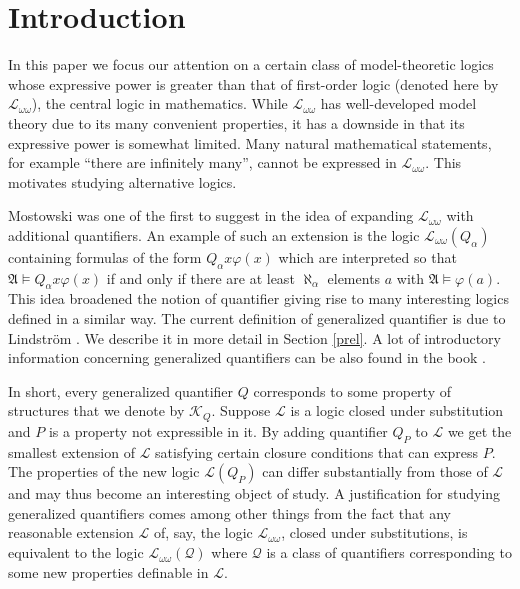 \documentclass{ndjflart}
\theoremstyle{plain}
\theoremstyle{definition}
\numberwithin{equation}{section}
\begin{document}

\section{Introduction}

In this paper we focus our attention on a certain class of model-theoretic logics whose expressive power is greater than that of first-order logic (denoted here by $\mathcal{L}_{\omega\omega}$), the central logic in mathematics.
While $\mathcal{L}_{\omega\omega}$ has well-developed model theory due to its many convenient properties, it has a downside in that its expressive power is somewhat limited. 
Many natural mathematical statements, for example ``there are infinitely many'', cannot be expressed in $\mathcal{L}_{\omega\omega}$.
This motivates studying alternative logics.

Mostowski was one of the first to suggest in \cite{Mostowski:1957} 
the idea of expanding $\mathcal{L}_{\omega\omega}$ with additional quantifiers.
An example of such an extension is the logic $\mathcal{L}_{\omega\omega}(Q_{\alpha})$ containing formulas of the form $Q_{\alpha} x \varphi(x)$ which are interpreted so that $\mathfrak{A} \vDash  Q_{\alpha} x \varphi(x)$ if and only if there are at least $\aleph_{\alpha}$ elements $a$ with $\mathfrak{A} \vDash \varphi(a)$.
This idea broadened the notion of quantifier giving rise to many interesting logics defined in a similar way. 
The current definition of generalized quantifier is due to Lindstr\"om \cite{Lindstrom:1966}. We describe it in more detail in Section \ref{prel}. 
A lot of introductory information concerning generalized quantifiers can be also found in the book \cite{Ebbinghaus:1985}.
 
In short, every generalized quantifier $Q$ corresponds to some property of structures that we denote by $\mathcal{K}_Q$.
Suppose $\mathcal{L}$ is a logic closed under substitution and $P$ is a property not expressible in it. By adding quantifier $Q_P$ to $\mathcal{L}$ we get the smallest extension of $\mathcal{L}$ satisfying certain closure conditions that can express $P$. 
The properties of the new logic $\mathcal{L}(Q_P)$ can differ substantially from those of $\mathcal{L}$ and may thus become an interesting object of study. 
A justification for studying generalized quantifiers comes among other things from the fact that any reasonable extension $\mathcal{L}$ of, say, the logic $\mathcal{L}_{\omega\omega}$,
closed under substitutions, is equivalent to the logic $\mathcal{L}_{\omega\omega}(\mathcal{Q})$ where $\mathcal{Q}$ is a class of quantifiers corresponding to some new properties definable in $\mathcal{L}$.
\end{document}
